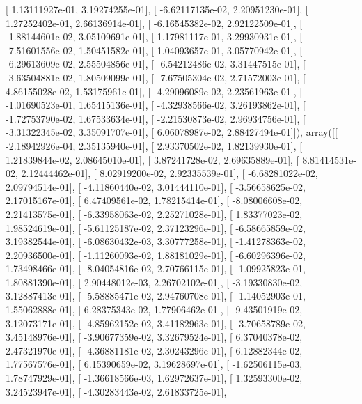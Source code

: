 \documentclass{article}
\begin{document}
       [  1.13111927e-01,   3.19274255e-01],
       [ -6.62117135e-02,   2.20951230e-01],
       [  1.27252402e-01,   2.66136914e-01],
       [ -6.16545382e-02,   2.92122509e-01],
       [ -1.88144601e-02,   3.05109691e-01],
       [  1.17981117e-01,   3.29930931e-01],
       [ -7.51601556e-02,   1.50451582e-01],
       [  1.04093657e-01,   3.05770942e-01],
       [ -6.29613609e-02,   2.55504856e-01],
       [ -6.54212486e-02,   3.31447515e-01],
       [ -3.63504881e-02,   1.80509099e-01],
       [ -7.67505304e-02,   2.71572003e-01],
       [  4.86155028e-02,   1.53175961e-01],
       [ -4.29096089e-02,   2.23561963e-01],
       [ -1.01690523e-01,   1.65415136e-01],
       [ -4.32938566e-02,   3.26193862e-01],
       [ -1.72753790e-02,   1.67533634e-01],
       [ -2.21530873e-02,   2.96934756e-01],
       [ -3.31322345e-02,   3.35091707e-01],
       [  6.06078987e-02,   2.88427494e-01]]), array([[ -2.18942926e-04,   2.35135940e-01],
       [  2.93370502e-02,   1.82139930e-01],
       [  1.21839844e-02,   2.08645010e-01],
       [  3.87241728e-02,   2.69635889e-01],
       [  8.81414531e-02,   2.12444462e-01],
       [  8.02919200e-02,   2.92335539e-01],
       [ -6.68281022e-02,   2.09794514e-01],
       [ -4.11860440e-02,   3.01444110e-01],
       [ -3.56658625e-02,   2.17015167e-01],
       [  6.47409561e-02,   1.78215414e-01],
       [ -8.08006608e-02,   2.21413575e-01],
       [ -6.33958063e-02,   2.25271028e-01],
       [  1.83377023e-02,   1.98524619e-01],
       [ -5.61125187e-02,   2.37123296e-01],
       [ -6.58665859e-02,   3.19382544e-01],
       [ -6.08630432e-03,   3.30777258e-01],
       [ -1.41278363e-02,   2.20936500e-01],
       [ -1.11260093e-02,   1.88181029e-01],
       [ -6.60296396e-02,   1.73498466e-01],
       [ -8.04054816e-02,   2.70766115e-01],
       [ -1.09925823e-01,   1.80881390e-01],
       [  2.90448012e-03,   2.26702102e-01],
       [ -3.19330830e-02,   3.12887413e-01],
       [ -5.58885471e-02,   2.94760708e-01],
       [ -1.14052903e-01,   1.55062888e-01],
       [  6.28375343e-02,   1.77906462e-01],
       [ -9.43501919e-02,   3.12073171e-01],
       [ -4.85962152e-02,   3.41182963e-01],
       [ -3.70658789e-02,   3.45148976e-01],
       [ -3.90677359e-02,   3.32679524e-01],
       [  6.37040378e-02,   2.47321970e-01],
       [ -4.36881181e-02,   2.30243296e-01],
       [  6.12882344e-02,   1.77567576e-01],
       [  6.15390659e-02,   3.19628697e-01],
       [ -1.62506115e-03,   1.78747929e-01],
       [ -1.36618566e-03,   1.62972637e-01],
       [  1.32593300e-02,   3.24523947e-01],
       [ -4.30283443e-02,   2.61833725e-01],
\end{document}
